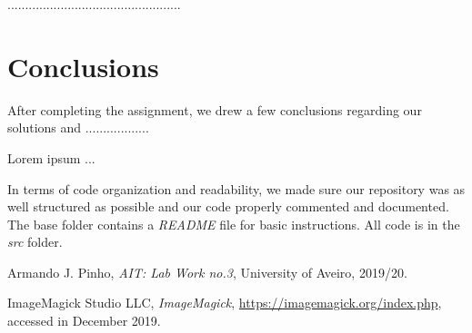 \documentclass[12pt]{article}
\begin{document}
.................................................

\section{Conclusions} %

After completing the assignment, we drew a few conclusions regarding our 
solutions and ..................

Lorem ipsum ...

In terms of code organization and readability, we made sure our 
repository was as well structured as possible and our code properly commented
and documented.
The base folder contains a {\it README\/} file for basic instructions.
All code is in the {\it src\/} folder.

\newpage
\begin{thebibliography}{9} %
  

    Armando J. Pinho,
    \textit{AIT: Lab Work no.3},
    University of Aveiro,
    2019/20.
  
    ImageMagick Studio LLC,
    \textit{ImageMagick},
    \url{https://imagemagick.org/index.php},
    accessed in December 2019.
  
\end{thebibliography}

\clearpage
\end{document}
